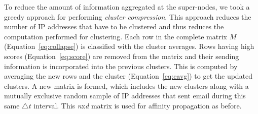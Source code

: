 To reduce the amount of information aggregated at the super-nodes, we took a greedy approach for performing \emph{cluster compression}. This approach reduces the number of IP addresses that have to be clustered and thus reduces the computation performed for clustering. Each row in the complete matrix $M$ (Equation~\ref{eq:collapse}) is classified with the cluster averages. Rows having high scores (Equation~\ref{eq:score}) are removed from the matrix and their sending information is incorporated into the previous clusters. This is computed by averaging the new rows and the cluster (Equation~\ref{eq:cavg}) to get the updated clusters. A new matrix is formed, which includes the new clusters along with a mutually exclusive random sample of IP addresses that sent email during this same \emph{$\bigtriangleup t$} interval. This \emph{n}x\emph{d} matrix is used for affinity propagation as before. 